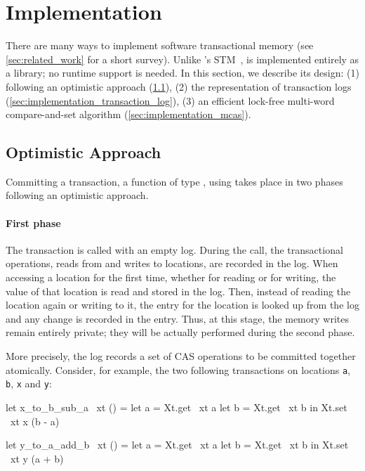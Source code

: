 \section{\Kcas Implementation}
\label{sec:implementation}

There are many ways to implement software transactional memory (see \cref{sec:related_work} for a short survey).
Unlike \Haskell's STM~\citep{DBLP:conf/ppopp/HarrisMPH05}, \Kcas is implemented entirely as a library; no runtime support is needed.
In this section, we describe its design: (1) following an optimistic approach (\cref{sec:implementation_optimistic_approach}), (2) the representation of transaction logs (\cref{sec:implementation_transaction_log}), (3) an efficient lock-free multi-word compare-and-set algorithm (\cref{sec:implementation_mcas}).

\subsection{Optimistic Approach}
\label{sec:implementation_optimistic_approach}

Committing a \Kcas transaction, \ie a function of type , using  takes place in two phases following an optimistic approach.

\paragraph{First phase}

The transaction is called with an empty log.
During the call, the transactional operations, \ie reads from and writes to locations, are recorded in the log.
When accessing a location for the first time, whether for reading or for writing, the value of that location is read and stored in the log.
Then, instead of reading the location again or writing to it, the entry for the location is looked up from the log and any change is recorded in the entry.
Thus, at this stage, the memory writes remain entirely private; they will be actually performed during the second phase.

More precisely, the log records a set of CAS operations to be committed together atomically.
Consider, for example, the two following transactions on locations \texttt{a}, \texttt{b}, \texttt{x} and \texttt{y}:

\smallskip
\begin{minipage}[t]{.45\textwidth}
\begin{ocamlcode}
let x_to_b_sub_a ~xt () =
  let a = Xt.get ~xt a
  let b = Xt.get ~xt b in
  Xt.set ~xt x (b - a)
\end{ocamlcode}
\end{minipage}
\hfill
\begin{minipage}[t]{.45\textwidth}
\begin{ocamlcode}
let y_to_a_add_b ~xt () =
  let a = Xt.get ~xt a
  let b = Xt.get ~xt b in
  Xt.set ~xt y (a + b)
\end{ocamlcode}
\end{minipage}
\smallskip

